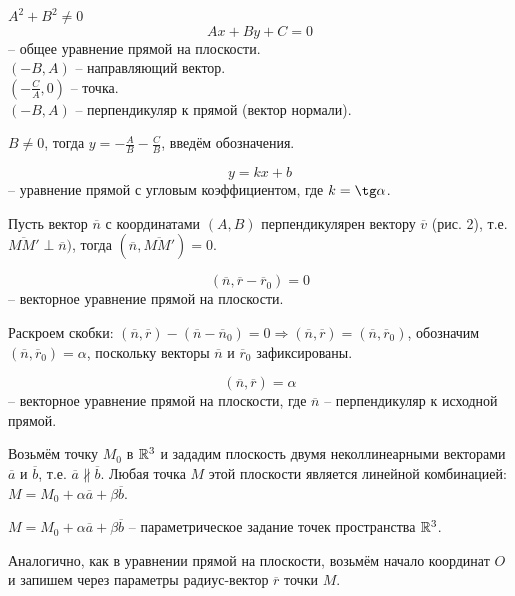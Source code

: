 	\begin{Def}
		$A^2 + B^2 \neq 0$
		$$Ax + By + C = 0$$ -- общее уравнение прямой на плоскости. \\
		$(-B, A)$ -- направляющий вектор.\\
		$(-\frac{C}{A}, 0)$ -- точка.\\
		$(-B, A)$ -- перпендикуляр к прямой (вектор нормали). 
	\end{Def}

	$B \neq 0$, тогда $y = -\frac{A}{B} - \frac{C}{B}$, введём обозначения.
	\begin{Def}
		$$y = kx + b$$ -- уравнение прямой с угловым коэффициентом, где $k = \tg \alpha$.
	\end{Def}

	Пусть вектор $\overline{n}$ с координатами $(A,B)$ перпендикулярен вектору  $\overline{v}$ (рис. 2), т.е. $\overline{MM'} \perp \overline{n})$, тогда $(\overline{n}, \overline{MM'}) = 0$.

	\begin{Def}
		$$(\overline{n}, \overline{r} - \overline{r}_0) = 0$$ -- векторное уравнение прямой на плоскости.
	\end{Def}

	Раскроем скобки: $(\overline{n}, \overline{r}) - (\overline{n} - \overline{n}_0) = 0 \Rightarrow (\overline{n}, \overline{r}) = (\overline{n}, \overline{r}_0)$, обозначим $(\overline{n}, \overline{r}_0) = \alpha$, поскольку векторы $\overline{n}$ и $\overline{r}_0$ зафиксированы.

	\begin{Def}
		$$(\overline{n}, \overline{r}) = \alpha$$ -- векторное уравнение прямой на плоскости, где $\overline{n}$ -- перпендикуляр к исходной прямой.
	\end{Def}

	
	Возьмём точку $M_0$ в $\mathbb{R}^3$ и зададим плоскость двумя неколлинеарными векторами $\overline{a}$ и $\overline{b}$, т.е. $\overline{a} \nparallel \overline{b}$. Любая точка $M$ этой плоскости является линейной комбинацией: $M = M_0 + \alpha \overline{a} + \beta \overline{b}$.
	
	\begin{Def}
		$M = M_0 + \alpha \overline{a}  + \beta \overline{b}$ -- параметрическое задание точек пространства $\mathbb{R}^3$.
	\end{Def}
	
	Аналогично, как в уравнении прямой на плоскости, возьмём начало координат $O$ и запишем через параметры радиус-вектор $\overline{r}$ точки $M$.


